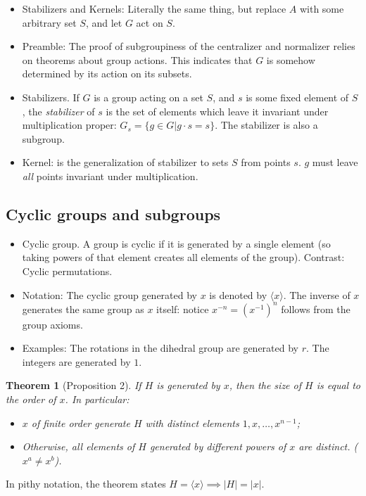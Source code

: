 \documentclass[1    0pt, answers]{exam} \renewcommand{\baselinestretch}{1.05}
\theoremstyle{plain}
\newtheorem{theorem}{Theorem}
\theoremstyle{definition}
\begin{document}
\begin{questions}
\begin{itemize}
\begin{itemize}
    \item Let $G$ be the symmetric group (permutation group) on 3-sets $S_3$, and $A$ be the subgroup $\{ (1), (1 2) \}$:
    \item The center and normalizer of $A$ are both $A$ (One proof is by Lagrange's Theorem);
    \item The center of $G$ is the identity alone.
\end{itemize}
\item Stabilizers and Kernels: Literally the same thing, but replace $A$ with some arbitrary set $S$, and let $G$ act on $S$.
\item Preamble: The proof of subgroupiness of the centralizer and normalizer relies on theorems about group actions. This indicates that $G$ is somehow determined by its action on its subsets.
\item Stabilizers. If $G$ is a group acting on a set $S$, and $s$ is some fixed element of $S$, the \emph{stabilizer} of $s$ is the set of elements which leave it invariant under multiplication proper: $G_s = \{ g \in G | g \cdot s = s \}$. The stabilizer is also a subgroup.
\item Kernel: is the generalization of stabilizer to sets $S$ from points $s$. $g$ must leave \emph{all} points invariant under multiplication.
\end{itemize}

\subsection{Cyclic groups and subgroups}
\begin{itemize}
\item Cyclic group. A group is cyclic if it is generated by a single element (so taking powers of that element creates all elements of the group). Contrast: Cyclic permutations.
\item Notation: The cyclic group generated by $x$ is denoted by $\langle x \rangle$. The inverse of $x$ generates the same group as $x$ itself: notice $x^{-n} = (x^{-1})^n$ follows from the group axioms.
\item Examples: The rotations in the dihedral group are generated by $r$. The integers are generated by $1$. 
\end{itemize}

\begin{theorem}[Proposition 2]
If $H$ is generated by $x$, then the size of $H$ is equal to the order of $x$. In particular:
\begin{itemize}
\item $x$ of finite order generate $H$ with distinct elements $1, x, \ldots, x^{n-1}$;
\item Otherwise, all elements of $H$ generated by different powers of $x$ are distinct. ($x^a \neq x^b$).
\end{itemize}
\end{theorem}
In pithy notation, the theorem states $H = \langle x \rangle \implies |H| = |x|$.


\end{questions}
\end{document}
